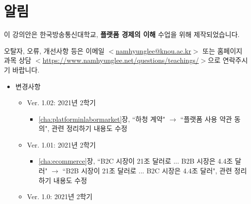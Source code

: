 \chapter*{알림}

이 강의안은 한국방송통신대학교, \textbf{플랫폼 경제의 이해} 수업을 위해 제작되었습니다.


오탈자, 오류, 개선사항 등은 이메일 $<$\href{mailto:namhyunglee@knou.ac.kr}{namhyunglee@knou.ac.kr}$>$ 또는 홈페이지 과목 상담 $<$\url{https://www.namhyunglee.net/questions/teachings/}$>$으로 연락주시기 바랍니다.

\begin{itemize}
\item 변경사항
	\begin{itemize}
	\item Ver. 1.02: 2021년 2학기
		\begin{itemize}
		\item \ref{cha:platforminlabormarket}장, ``하청 계약" $\rightarrow$ ``플랫폼 사용 약관 동의", 관련 정리하기 내용도 수정
		\end{itemize}
	\item Ver. 1.01: 2021년 2학기
		\begin{itemize}
		\item \ref{cha:ecommerce}장, ``B2C 시장이 21조 달러로 ... B2B 시장은 4.4조 달러" $\rightarrow$ ``B2B 시장이 21조 달러로 ... B2C 시장은 4.4조 달러", 관련 정리하기 내용도 수정
		\end{itemize}
	\item Ver. 1.0: 2021년 2학기
	\end{itemize}
\end{itemize}